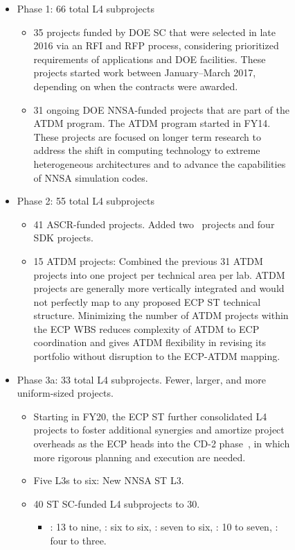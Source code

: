 \begin{figure}
\begin{mdframed}
\begin{itemize}
\item Phase 1: 66 total L4 subprojects
\begin{itemize}
\item 35 projects funded by DOE SC that were selected in late 2016 via an RFI and RFP process, considering prioritized requirements of applications and DOE facilities. 
These projects started work between January--March 2017, depending on when the contracts were awarded.
\item 31 ongoing DOE NNSA-funded projects that are part of the ATDM program. The ATDM program started in FY14.  These projects are focused on longer term research to address the shift in computing technology to extreme heterogeneous architectures and to advance the capabilities of NNSA simulation codes.
\end{itemize}
\item Phase 2: 55 total L4 subprojects
\begin{itemize}
\item 41 ASCR-funded projects.  Added  two \ecosystem\ projects and four SDK projects.
\item 15 ATDM projects: Combined the previous 31 ATDM projects into one project per technical area per lab.  ATDM projects are generally more vertically integrated and would not perfectly map to any proposed ECP ST technical structure.  Minimizing the number of ATDM projects within the ECP WBS reduces complexity of ATDM to ECP coordination and gives ATDM flexibility in revising its portfolio without disruption to the ECP-ATDM mapping.
\end{itemize}
\item Phase 3a: 33 total L4 subprojects.  Fewer, larger, and more uniform-sized projects.
\begin{itemize}
	\item Starting in FY20, the ECP ST further consolidated L4 projects to foster additional synergies and amortize project overheads as the ECP heads into the CD-2 phase~\cite{413.3B}, in which more rigorous planning and execution are needed.
	\item Five L3s to six: New NNSA ST L3.
	\item 40 ST SC-funded L4 subprojects to 30.
	\begin{itemize}
	\item \pmr: 13 to nine, \tools: six to six, \mathlibs: seven to six, \dataviz: 10 to seven, \ecosystem: four to three.

\end{itemize}
\end{itemize}
\end{itemize}
\end{mdframed}
\end{figure}
